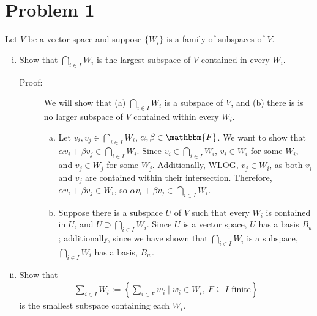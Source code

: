 \documentclass[8pt]{extarticle}
\title{}
\author{}
\date{}
\begin{document}
  \section{Problem 1}%
  Let $V$ be a vector space and suppose $\{W_i\}$ is a family of subspaces of $V$.
  \begin{enumerate}[(i)]
    \item Show that $\bigcap_{i\in I} W_i$ is the largest subspace of $V$ contained in every $W_i$.
    \begin{description}
      \item[Proof:] We will show that (a) $\bigcap_{i\in I} W_i$ is a subspace of $V$, and (b) there is is no larger subspace of $V$ contained within every $W_i$.
        \begin{enumerate}[(a)]
          \item Let $v_i, v_j\in \bigcap_{i\in I} W_i$, $\alpha,\beta \in \mathbbm{F}$. We want to show that $\alpha v_i + \beta v_j \in \bigcap_{i\in I}W_i$. Since $v_i\in \bigcap_{i\in I}W_i$, $v_i \in W_i$ for some $W_i$, and $v_j\in W_j$ for some $W_j$. Additionally, WLOG, $v_j\in W_i$, as both $v_i$ and $v_j$ are contained within their intersection. Therefore, $\alpha v_i + \beta v_j\in W_i$, so $\alpha v_i + \beta v_j\in \bigcap_{i\in I}W_i$.
          \item Suppose there is a subspace $U$ of $V$ such that every $W_i$ is contained in $U$, and $U \supset \bigcap_{i\in I}W_i$. Since $U$ is a vector space, $U$ has a basis $B_u$; additionally, since we have shown that $\bigcap_{i\in I}W_i$ is a subspace, $\bigcap_{i\in I} W_i$ has a basis, $B_w$.
        \end{enumerate}
    \end{description}
    \item Show that
      \begin{align*}
        \sum_{i\in I}W_i := \left\{\sum_{i\in F}w_i \mid w_i\in W_i,~F\subseteq I \text{ finite}\right\}
      \end{align*}
      is the smallest subspace containing each $W_i$.
  \end{enumerate}
\end{document}
